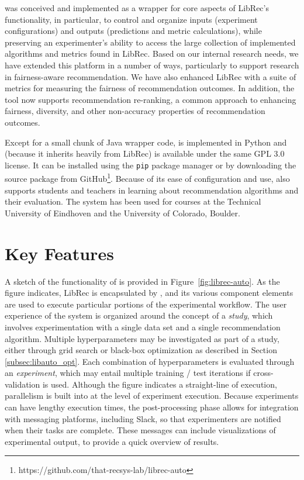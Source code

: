 \libauto{} was conceived and implemented as a wrapper for core aspects of LibRec's functionality, in particular, to control and organize inputs (experiment configurations) and outputs (predictions and metric calculations), while preserving an experimenter's ability to access the large collection of implemented algorithms and metrics found in LibRec. Based on our internal research needs, we have extended this platform in a number of ways, particularly to support research in fairness-aware recommendation. We have also enhanced LibRec with a suite of metrics for measuring the fairness of recommendation outcomes. In addition, the tool now supports recommendation re-ranking, a common approach to enhancing fairness, diversity, and other non-accuracy properties of recommendation outcomes.

Except for a small chunk of Java wrapper code, \libauto{} is implemented in Python and (because it inherits heavily from LibRec) is available under the same GPL 3.0 license. It can be installed using the \texttt{pip} package manager or by downloading the source package from GitHub\footnote{https://github.com/that-recsys-lab/librec-auto}. Because of its ease of configuration and use, \libauto{} also supports students and teachers in learning about recommendation algorithms and their evaluation. The system has been used for courses at the Technical University of Eindhoven and the University of Colorado, Boulder. 

\section{Key Features}
\label{sec:libauto_keyfeatures}

A sketch of the functionality of \libauto{} is provided in Figure~\ref{fig:librec-auto}. As the figure indicates, LibRec is encapsulated by \libauto{}, and its various component elements are used to execute particular portions of the experimental workflow. The user experience of the system is organized around the concept of a \textit{study}, which involves experimentation with a single data set and a single recommendation algorithm. Multiple hyperparameters may be investigated as part of a study, either through grid search or black-box optimization as described in Section \ref{subsec:libauto_opt}. Each combination of hyperparameters is evaluated through an \textit{experiment}, which may entail multiple training / test iterations if cross-validation is used. Although the figure indicates a straight-line of execution, parallelism is built into \libauto{} at the level of experiment execution. Because experiments can have lengthy execution times, the post-processing phase allows for integration with messaging platforms, including Slack, so that experimenters are notified when their tasks are complete. These messages can include visualizations of experimental output, to provide a quick overview of results.

